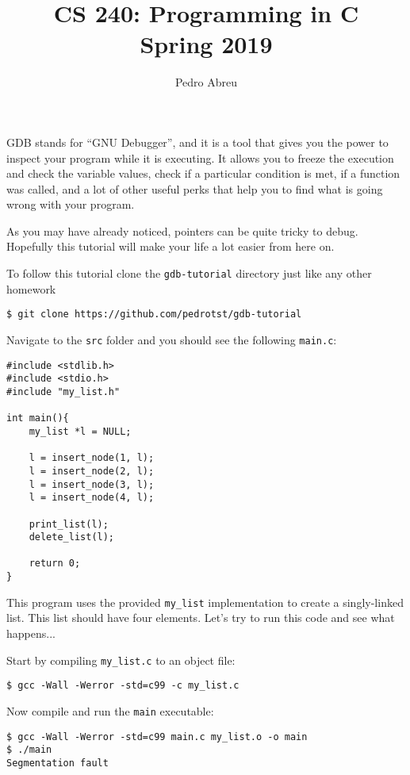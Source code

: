 \documentclass[11pt]{article}
\begin{document}
\title{CS 240: Programming in C\\ Spring 2019}
\author{Pedro Abreu}
\maketitle

GDB stands for ``GNU Debugger'', and it is a tool that gives you the
power to inspect your program while it is executing. It allows you to
freeze the execution and check the variable values, check if a particular
condition is met, if a function was called, and a lot of other useful
perks that help you to find what is going wrong with your program.

As you may have already noticed, pointers can be quite tricky to
debug. Hopefully this tutorial will make your life a lot easier from
here on.

To follow this tutorial clone the {\tt gdb-tutorial} directory just like any
other homework
\begin{verbatim}
$ git clone https://github.com/pedrotst/gdb-tutorial
\end{verbatim}

Navigate to the {\tt src} folder and you should see the following {\tt main.c}:
\begin{verbatim}
#include <stdlib.h> 
#include <stdio.h> 
#include "my_list.h" 
 
int main(){ 
    my_list *l = NULL; 
 
    l = insert_node(1, l); 
    l = insert_node(2, l); 
    l = insert_node(3, l); 
    l = insert_node(4, l); 
 
    print_list(l); 
    delete_list(l); 
 
    return 0; 
}
\end{verbatim}

This program uses the provided {\tt my\_list} implementation to create
a singly-linked list. This list should have four elements. Let's try to
run this code and see what happens...

\clearpage

Start by compiling {\tt my\_list.c} to an object file:
\begin{verbatim}
$ gcc -Wall -Werror -std=c99 -c my_list.c
\end{verbatim}

Now compile and run the {\tt main} executable:
\begin{verbatim}
$ gcc -Wall -Werror -std=c99 main.c my_list.o -o main
$ ./main
Segmentation fault
\end{verbatim}
\end{document}
